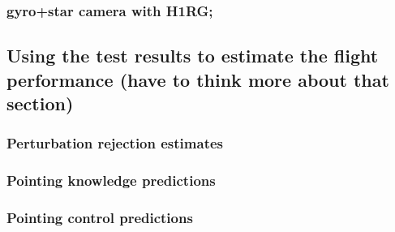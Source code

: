\subsubsection{	gyro+star camera with H1RG;}
\subsection{	Using the test results to estimate the flight performance (have to think more about that section)}
\subsubsection{	Perturbation rejection estimates}
\subsubsection{	Pointing knowledge predictions}
\subsubsection{	Pointing control predictions}
